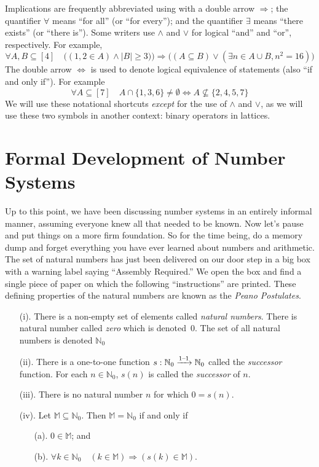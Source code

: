 Implications are frequently abbreviated using with
a double arrow $\Longrightarrow$; the quantifier $\forall$ means ``for all'' 
(or ``for every''); and the quantifier $\exists$ means 
``there exists'' (or ``there is'').  Some
writers use $\wedge$ and $\vee$ for logical ``and'' and
``or'', respectively.  For example, 
\[
\forall A,B\subseteq[4]\quad \bigl((1,2\in A) \wedge |B|\ge 3)\bigr)
\Longrightarrow\bigl((A\subseteq B)\vee (\exists n\in A\cup B, 
 n^2=16)\bigr)
\]
The double arrow $\iff$ is used to denote logical equivalence
of statements (also ``if and only if'').  For example
\[
\forall A\subseteq[7]\quad A\cap\{1,3,6\}\neq\emptyset\iff
A\nsubseteq\{2,4,5,7\}
\]
We will use these notational shortcuts \textit{except} for
the use of $\wedge$ and $\vee$, as we will use these two symbols
in another context: binary operators in lattices. 

\section{Formal Development of Number Systems}\label{s:background:formal-num-sys}

Up to this point, we have been discussing number systems
in an entirely informal manner, assuming everyone knew
all that needed to be known.  Now let's pause and put
things on a more firm foundation.  So 
for the time being, do a memory dump and forget everything you have ever
learned about numbers and arithmetic. The set
of natural numbers has just been delivered on our
door step in a big box with a warning label saying ``Assembly
Required.''  We open the box and find a single piece of paper
on which the following ``instructions'' are printed.  These
defining properties of the natural numbers are known as the \textit{Peano 
Postulates}.

\begin{enumerate}
\item[(i).] There is a non-empty set of elements called 
\textit{natural numbers}.  There is natural number
called \textit{zero} which is denoted~$0$.  The set of all natural
numbers is denoted $\mathbb{N}_0$
\item[(ii).] There is a one-to-one function $s:\mathbb{N}_0
\xrightarrow[]{\text{$1$--$1$}} \mathbb{N}_0$
called the \textit{successor} function.  For each $n\in \mathbb{N}_0$,
$s(n)$ is called the \textit{successor} of $n$.
\item[(iii).] There is no natural number $n$ for which $0=s(n)$.
\item[(iv).] Let $\mathbb{M}\subseteq \mathbb{N}_0$.  
Then $\mathbb{M} =\mathbb{N}_0$ if and only if
\begin{enumerate}
\item[(a).] $0\in \mathbb{M}$; and 
\item[(b).] $\forall k\in \mathbb{N}_0\quad(k\in \mathbb{M}) 
  \Longrightarrow(s(k)\in \mathbb{M})$. 
\end{enumerate}
\end{enumerate}

